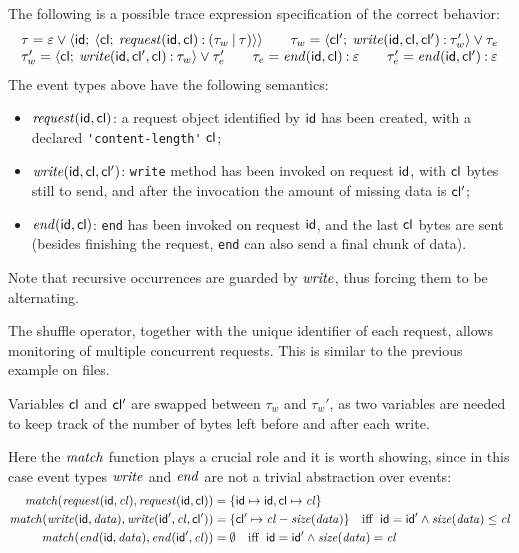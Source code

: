 The following is a possible trace expression specification of the correct behavior:
$$
\begin{array}{l}
\tau = \varepsilon \mathbin{\vee} {\langle}\mathsf{id};\:{{\langle}\mathsf{cl};\:{ \mathit{request}(\mathsf{id}, \mathsf{cl}) \mathbin{:} (\tau_w\mathbin{|}\tau)}{\rangle}}{\rangle}\qquad
\tau_w = {\langle}\mathsf{cl'};\:{\mathit{write}(\mathsf{id}, \mathsf{cl}, \mathsf{cl'})\mathbin{:}\tau_w'}{\rangle} \mathbin{\vee} \tau_e\\
\tau_w' = {\langle}\mathsf{cl};\:{\mathit{write}(\mathsf{id}, \mathsf{cl'}, \mathsf{cl})\mathbin{:} \tau_w}{\rangle} \mathbin{\vee} \tau_e'\qquad
\tau_e = \mathit{end}(\mathsf{id}, \mathsf{cl})\mathbin{:} \varepsilon\qquad
\tau_e' = \mathit{end}(\mathsf{id}, \mathsf{cl'})\mathbin{:}\varepsilon
\end{array}
$$
The event types above have the following semantics:
\begin{itemize}
\item  \(\mathit{request}(\mathsf{id}, \mathsf{cl})\): a request object identified by \(\mathsf{id}\) has been created, with a declared \lstinline{'content-length'} \(\mathsf{cl}\);
\item \(\mathit{write}(\mathsf{id}, \mathsf{cl}, \mathsf{cl'})\): \lstinline{write} method has been invoked on request \(\mathsf{id}\), with \(\mathsf{cl}\) bytes still to send, and after the invocation the amount of missing data is \(\mathsf{cl'}\);
\item \(\mathit{end}(\mathsf{id}, \mathsf{cl})\): \lstinline{end} has been invoked on request \(\mathsf{id}\), and the last \(\mathsf{cl}\) bytes are sent (besides finishing the request, \lstinline{end} can also send a final chunk of data).
\end{itemize}

Note that recursive occurrences are guarded by \(\mathit{write}\), thus forcing them to be alternating.

The shuffle operator, together with the unique identifier of each request, allows monitoring of multiple concurrent requests.
This is similar to the previous example on files.

Variables \(\mathsf{cl}\) and \(\mathsf{cl'}\) are swapped between \(\tau_w\) and \(\tau_w'\), as two variables are needed to keep track of the number of bytes left before and after each write.

Here the \(\mathit{match}\) function plays a crucial role and it is worth showing, since in this case event types $\mathit{write}$ and $\mathit{end}$ are not a trivial abstraction over events:
\small
\begin{align*}
\mathit{match}(\mathit{request}(\mathsf{id}, \mathit{cl}), \mathit{request}(\mathsf{id}, \mathsf{cl})) &= \{ \mathsf{id} \mapsto \mathsf{id}, \mathsf{cl} \mapsto \mathit{cl} \}\\
\mathit{match}(\mathit{write}(\mathsf{id}, \mathit{data}), \mathit{write}(\mathsf{id}', \mathit{cl}, \mathsf{cl'})) &= \{ \mathsf{cl'} \mapsto \mathit{cl}-\mathit{size}(\mathit{data}) \} \quad \mathrm{iff}\;\; \mathsf{id}=\mathsf{id}' \land \mathit{size}(\mathit{data})\leq\mathit{cl} \\
\mathit{match}(\mathit{end}(\mathsf{id}, \mathit{data}), \mathit{end}(\mathsf{id}', \mathit{cl})) &= \emptyset \quad \mathrm{iff}\;\; \mathsf{id}=\mathsf{id}' \land \mathit{size}(\mathit{data})=\mathit{cl}
\end{align*}
\normalsize


